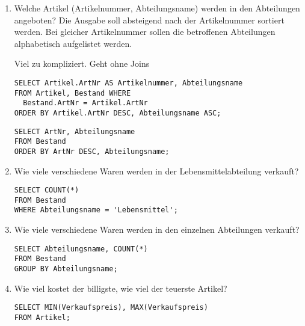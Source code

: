 \documentclass{lehramt-informatik}
\begin{document}
\begin{enumerate}


\item Welche Artikel (Artikelnummer, Abteilungsname) werden in den
Abteilungen angeboten? Die Ausgabe soll absteigend nach der
Artikelnummer sortiert werden. Bei gleicher Artikelnummer sollen die
betroffenen Abteilungen alphabetisch aufgelistet werden.

\begin{antwort}[richtig]
Viel zu kompliziert. Geht ohne Joins
\begin{verbatim}
SELECT Artikel.ArtNr AS Artikelnummer, Abteilungsname
FROM Artikel, Bestand WHERE
  Bestand.ArtNr = Artikel.ArtNr
ORDER BY Artikel.ArtNr DESC, Abteilungsname ASC;
\end{verbatim}
\end{antwort}

\begin{antwort}[muster]
\begin{verbatim}
SELECT ArtNr, Abteilungsname
FROM Bestand
ORDER BY ArtNr DESC, Abteilungsname;
\end{verbatim}
\end{antwort}

\item Wie viele verschiedene Waren werden in der Lebensmittelabteilung
verkauft?

\begin{antwort}[muster]
\begin{verbatim}
SELECT COUNT(*)
FROM Bestand
WHERE Abteilungsname = 'Lebensmittel';
\end{verbatim}
\end{antwort}


\item Wie viele verschiedene Waren werden in den einzelnen Abteilungen
verkauft?

\begin{antwort}[muster]
\begin{verbatim}
SELECT Abteilungsname, COUNT(*)
FROM Bestand
GROUP BY Abteilungsname;
\end{verbatim}
\end{antwort}


\item Wie viel kostet der billigste, wie viel der teuerste Artikel?

\begin{antwort}[muster]
\begin{verbatim}
SELECT MIN(Verkaufspreis), MAX(Verkaufspreis)
FROM Artikel;
\end{verbatim}
\end{antwort}


\end{enumerate}
\end{document}

